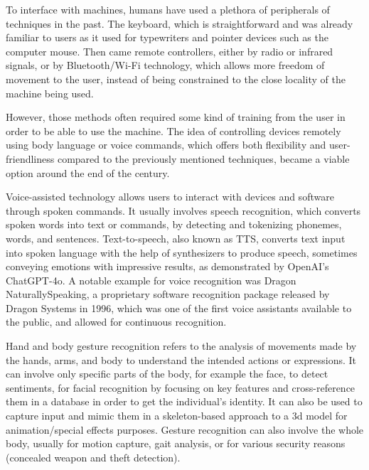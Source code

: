 \documentclass[12pt]{article}
\begin{document}
To interface with machines, humans have used a plethora of peripherals of techniques in the past. The keyboard, which is straightforward and was already familiar to users as it used for typewriters and pointer devices such as the computer mouse. Then came remote controllers, either by radio or infrared signals, or by Bluetooth/Wi-Fi technology, which allows more freedom of movement to the user, instead of being constrained to the close locality of the machine being used.

However, those methods often required some kind of training from the user in order to be able to use the machine. The idea of controlling devices remotely using body language or voice commands, which offers both flexibility and user-friendliness compared to the previously mentioned techniques, became a viable option around the end of the century.

Voice-assisted technology allows users to interact with devices and software through spoken commands. It usually involves speech recognition, which converts spoken words into text or commands, by detecting and tokenizing phonemes, words, and sentences. Text-to-speech, also known as TTS, converts text input into spoken language with the help of synthesizers to produce speech, sometimes conveying emotions with impressive results, as demonstrated by OpenAI's ChatGPT-4o. A notable example for voice recognition was Dragon NaturallySpeaking, a proprietary software recognition package released by Dragon Systems in 1996, which was one of the first voice assistants available to the public, and allowed for continuous recognition.

Hand and body gesture recognition refers to the analysis of movements made by the hands, arms, and body to understand the intended actions or expressions. It can involve only specific parts of the body, for example the face, to detect sentiments, for facial recognition by focusing on key features and cross-reference them in a database in order to get the individual's identity. It can also be used to capture input and mimic them in a skeleton-based approach to a 3d model for animation/special effects purposes.
Gesture recognition can also involve the whole body, usually for motion capture, gait analysis, or for various security reasons (concealed weapon and theft detection).
\end{document}
